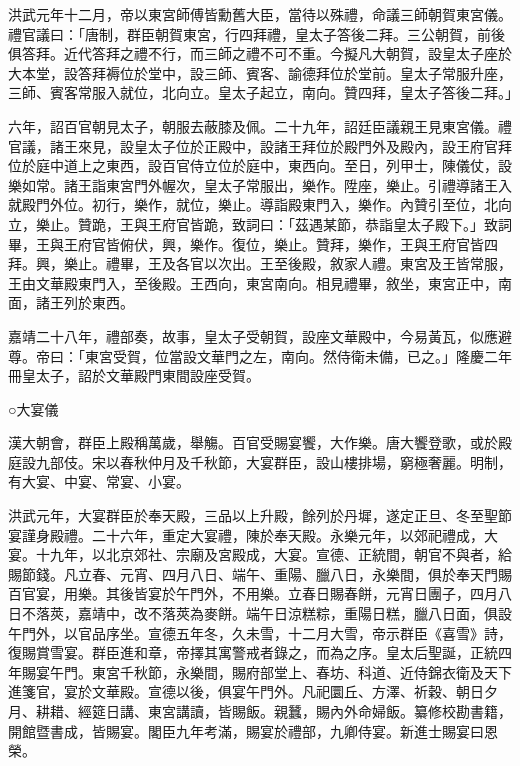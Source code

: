 洪武元年十二月，帝以東宮師傅皆勳舊大臣，當待以殊禮，命議三師朝賀東宮儀。禮官議曰：「唐制，群臣朝賀東宮，行四拜禮，皇太子答後二拜。三公朝賀，前後俱答拜。近代答拜之禮不行，而三師之禮不可不重。今擬凡大朝賀，設皇太子座於大本堂，設答拜褥位於堂中，設三師、賓客、諭德拜位於堂前。皇太子常服升座，三師、賓客常服入就位，北向立。皇太子起立，南向。贊四拜，皇太子答後二拜。」

六年，詔百官朝見太子，朝服去蔽膝及佩。二十九年，詔廷臣議親王見東宮儀。禮官議，諸王來見，設皇太子位於正殿中，設諸王拜位於殿門外及殿內，設王府官拜位於庭中道上之東西，設百官侍立位於庭中，東西向。至日，列甲士，陳儀仗，設樂如常。諸王詣東宮門外幄次，皇太子常服出，樂作。陞座，樂止。引禮導諸王入就殿門外位。初行，樂作，就位，樂止。導詣殿東門入，樂作。內贊引至位，北向立，樂止。贊跪，王與王府官皆跪，致詞曰：「茲遇某節，恭詣皇太子殿下。」致詞畢，王與王府官皆俯伏，興，樂作。復位，樂止。贊拜，樂作，王與王府官皆四拜。興，樂止。禮畢，王及各官以次出。王至後殿，敘家人禮。東宮及王皆常服，王由文華殿東門入，至後殿。王西向，東宮南向。相見禮畢，敘坐，東宮正中，南面，諸王列於東西。

嘉靖二十八年，禮部奏，故事，皇太子受朝賀，設座文華殿中，今易黃瓦，似應避尊。帝曰：「東宮受賀，位當設文華門之左，南向。然侍衛未備，已之。」隆慶二年冊皇太子，詔於文華殿門東間設座受賀。

○大宴儀

漢大朝會，群臣上殿稱萬歲，舉觴。百官受賜宴饗，大作樂。唐大饗登歌，或於殿庭設九部伎。宋以春秋仲月及千秋節，大宴群臣，設山樓排場，窮極奢麗。明制，有大宴、中宴、常宴、小宴。

洪武元年，大宴群臣於奉天殿，三品以上升殿，餘列於丹墀，遂定正旦、冬至聖節宴謹身殿禮。二十六年，重定大宴禮，陳於奉天殿。永樂元年，以郊祀禮成，大宴。十九年，以北京郊社、宗廟及宮殿成，大宴。宣德、正統間，朝官不與者，給賜節錢。凡立春、元宵、四月八日、端午、重陽、臘八日，永樂間，俱於奉天門賜百官宴，用樂。其後皆宴於午門外，不用樂。立春日賜春餅，元宵日團子，四月八日不落莢，嘉靖中，改不落莢為麥餅。端午日涼糕粽，重陽日糕，臘八日面，俱設午門外，以官品序坐。宣德五年冬，久未雪，十二月大雪，帝示群臣《喜雪》詩，復賜賞雪宴。群臣進和章，帝擇其寓警戒者錄之，而為之序。皇太后聖誕，正統四年賜宴午門。東宮千秋節，永樂間，賜府部堂上、春坊、科道、近侍錦衣衛及天下進箋官，宴於文華殿。宣德以後，俱宴午門外。凡祀圜丘、方澤、祈穀、朝日夕月、耕耤、經筵日講、東宮講讀，皆賜飯。親蠶，賜內外命婦飯。纂修校勘書籍，開館暨書成，皆賜宴。閣臣九年考滿，賜宴於禮部，九卿侍宴。新進士賜宴曰恩榮。

